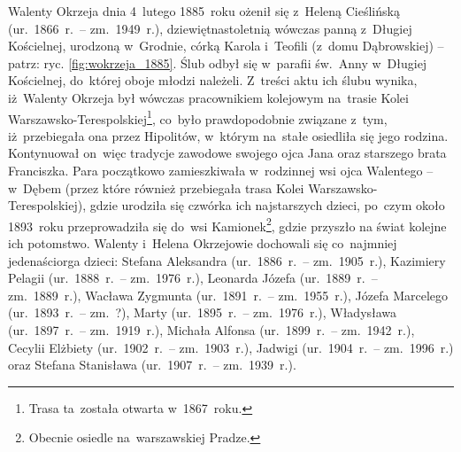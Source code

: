 Walenty Okrzeja dnia 4~lutego
1885~roku ożenił się z~Heleną
Cieślińską
(ur.~1866~r.~-- zm.~1949~r.), dziewiętnastoletnią wówczas panną z~Długiej
Kościelnej, urodzoną w~Grodnie, córką Karola i~Teofili (z~domu Dąbrowskiej) --
patrz: ryc. \ref{fig:wokrzeja_1885}. Ślub odbył się w~parafii św.~Anny
w~Długiej Kościelnej, do~której oboje młodzi należeli. Z~treści aktu ich ślubu
wynika, iż~Walenty Okrzeja był wówczas pracownikiem kolejowym na~trasie Kolei
Warszawsko-Terespolskiej\footnote{Trasa ta~została otwarta w~1867~roku.},
co~było prawdopodobnie związane z~tym, iż~przebiegała ona przez Hipolitów,
w~którym na~stałe osiedliła się jego rodzina. Kontynuował on~więc tradycje
zawodowe swojego ojca
Jana oraz starszego brata
Franciszka.
Para początkowo zamieszkiwała w~rodzinnej wsi ojca Walentego -- w~Dębem
(przez które również przebiegała trasa Kolei Warszawsko-Terespolskiej), gdzie
urodziła się czwórka ich najstarszych dzieci, po~czym około 1893~roku
przeprowadziła się do~wsi Kamionek\footnote{Obecnie osiedle na~warszawskiej
Pradze.}, gdzie przyszło na świat kolejne ich potomstwo.
Walenty
i~Helena
Okrzejowie dochowali się co~najmniej jedenaściorga dzieci:
Stefana Aleksandra
(ur.~1886~r.~-- zm.~1905~r.),
Kazimiery Pelagii
(ur.~1888~r.~-- zm.~1976~r.),
Leonarda Józefa
(ur.~1889~r.~-- zm.~1889~r.),
Wacława Zygmunta
(ur.~1891~r.~-- zm.~1955~r.),
Józefa Marcelego
(ur.~1893~r.~-- zm.~?),
Marty
(ur.~1895~r.~-- zm.~1976~r.),
Władysława
(ur.~1897~r.~-- zm.~1919~r.),
Michała Alfonsa
(ur.~1899~r.~-- zm.~1942~r.),
Cecylii Elżbiety
(ur.~1902~r.~-- zm.~1903~r.),
Jadwigi
(ur.~1904~r.~-- zm.~1996~r.) oraz
Stefana Stanisława
(ur.~1907~r.~-- zm.~1939~r.).


